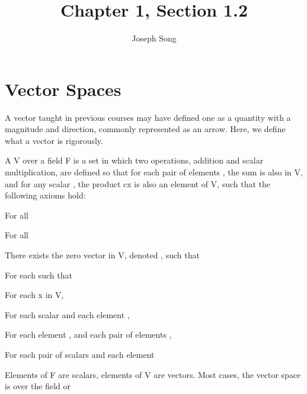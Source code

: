 \documentclass{article}
\title{Chapter 1, Section 1.2}
\author{Joseph Song}
\date{}
\begin{document}
\maketitle

\section{Vector Spaces}

A vector taught in previous courses may have defined one as a quantity with a magnitude and direction, commonly represented as an arrow. Here, we define what a vector is rigorously.

\begin{definition}
A  V over a field F is a set in which two operations, addition and scalar multiplication, are defined so that for each pair of elements , the sum  is also in V, and for any scalar , the product cx is also an element of V, such that the following axioms hold:
\end{definition}

\begin{axioms}
    \item For all 
    \item For all 
    \item There exists the zero vector in V, denoted , such that 
    \item For each  such that 
    \item For each x in V, 
    \item For each scalar  and each element , 
    \item For each element , and each pair of elements , 
    \item For each pair of scalars  and each element 
\end{axioms}


\mm{\star} Elements of F are scalars, elements of V are vectors. Most cases, the vector space is over the field  or \newline
\end{document}
